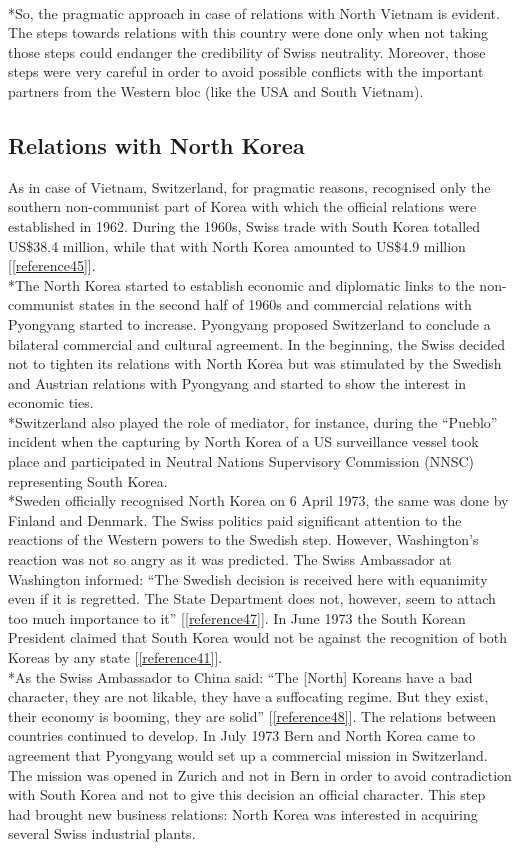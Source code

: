 \documentclass[a4paper]{article}
\begin{document}
\\*So, the pragmatic approach in case of relations with North Vietnam is evident. The steps towards relations with this country were done only when not taking those steps could endanger the credibility of Swiss neutrality. Moreover, those steps were very careful in order to avoid possible conflicts with the important partners from the Western bloc (like the USA and South Vietnam).
\subsection{Relations with North Korea}
As in case of Vietnam, Switzerland, for pragmatic reasons, recognised only the southern non-communist part of Korea with which the official relations were established in 1962. During the 1960s, Swiss trade with South Korea totalled US\$38.4 million, while that with North Korea amounted to US\$4.9 million [\ref{reference45}].
\\*The North Korea started to establish economic and diplomatic links to the non-communist states in the second half of 1960s and commercial relations with Pyongyang started to increase. Pyongyang proposed Switzerland to conclude a bilateral commercial and cultural agreement. In the beginning, the Swiss decided not to tighten its relations with North Korea but was stimulated by the Swedish and Austrian relations with Pyongyang and started to show the interest in economic ties.
\\*Switzerland also played the role of mediator, for instance, during the “Pueblo” incident when the capturing by North Korea of a US surveillance vessel took place and participated in Neutral Nations Supervisory Commission (NNSC) representing South Korea.
\\*Sweden officially recognised North Korea on 6 April 1973, the same was done by Finland and Denmark. The Swiss politics paid significant attention to the reactions of the Western powers to the Swedish step. However, Washington’s reaction was not so angry as it was predicted. The Swiss Ambassador at Washington informed: “The Swedish decision is received here with equanimity even if it is regretted. The State Department does not, however, seem to attach too much importance to it” [\ref{reference47}]. In June 1973 the South Korean President claimed that South Korea would not be against the recognition of both Koreas by any state [\ref{reference41}].
\\*As the Swiss Ambassador to China said: “The [North] Koreans have a bad character, they are not likable, they have a suffocating regime. But they exist, their economy is booming, they are solid” [\ref{reference48}]. The relations between countries continued to develop. In July 1973 Bern and North Korea came to agreement that Pyongyang would set up a commercial mission in Switzerland. The mission was opened in Zurich and not in Bern in order to avoid contradiction with South Korea and not to give this decision an official character. This step had brought new business relations: North Korea was interested in acquiring several Swiss industrial plants. 
\end{document}
